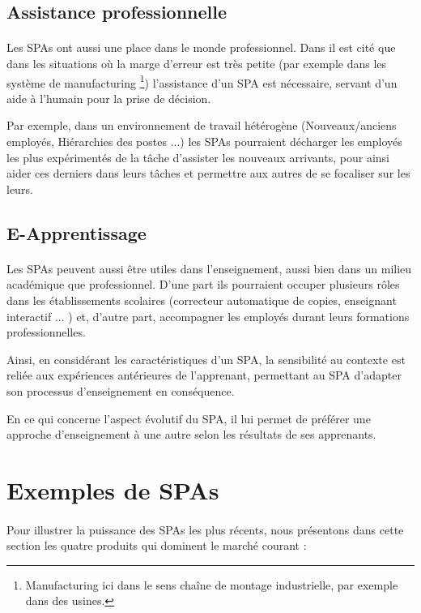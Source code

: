 \subsection{Assistance professionnelle}
\paragraph{}
Les SPAs ont aussi une place dans le monde professionnel. Dans \cite{Imtiaz2014} il est cité que dans les situations où la marge d'erreur est très petite (par exemple dans les système de manufacturing \footnote{Manufacturing ici dans le sens chaîne de montage industrielle, par exemple dans des usines.}) l'assistance d'un SPA est nécessaire, servant d'un aide à l'humain pour la prise de décision.
\par
Par exemple, dans un environnement de travail hétérogène (Nouveaux/anciens employés, Hiérarchies des postes ...) les SPAs pourraient décharger les employés les plus expérimentés de la tâche d'assister les nouveaux arrivants, pour ainsi aider ces derniers dans leurs tâches et permettre aux autres de se focaliser sur les leurs.

\subsection{E-Apprentissage}
\paragraph{}
Les SPAs peuvent aussi être utiles dans l'enseignement, aussi  bien dans un milieu académique que professionnel. D'une part ils pourraient occuper plusieurs rôles dans les établissements scolaires (correcteur automatique de copies, enseignant interactif ... ) \cite{ENGAGINGTA} et, d'autre part, accompagner les employés durant leurs formations professionnelles.
\par
Ainsi, en considérant les caractéristiques d'un SPA, la sensibilité au contexte est reliée aux expériences antérieures de l'apprenant, permettant au SPA d'adapter son processus d'enseignement en conséquence.
\par 
En ce qui concerne l'aspect évolutif du SPA, il lui permet de préférer une approche d'enseignement à une autre selon les résultats de ses apprenants.

\section{Exemples de SPAs}
\paragraph{}
Pour illustrer la puissance des SPAs les plus récents, nous présentons dans cette section les quatre produits qui dominent le marché courant :

